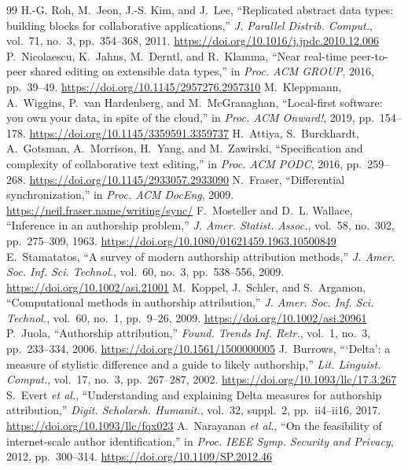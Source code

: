 \documentclass[conference]{IEEEtran}
\begin{document}
\begin{thebibliography}{99}
 H.-G. Roh, M.~Jeon, J.-S. Kim, and J.~Lee, ``Replicated abstract data types: building blocks for collaborative applications,'' \emph{J. Parallel Distrib. Comput.}, vol.~71, no.~3, pp.~354--368, 2011. \url{https://doi.org/10.1016/j.jpdc.2010.12.006}
 P.~Nicolaescu, K.~Jahns, M.~Derntl, and R.~Klamma, ``Near real-time peer-to-peer shared editing on extensible data types,'' in \emph{Proc. ACM GROUP}, 2016, pp.~39--49. \url{https://doi.org/10.1145/2957276.2957310}
 M.~Kleppmann, A.~Wiggins, P.~van Hardenberg, and M.~McGranaghan, ``Local-first software: you own your data, in spite of the cloud,'' in \emph{Proc. ACM Onward!}, 2019, pp.~154--178. \url{https://doi.org/10.1145/3359591.3359737}
 H.~Attiya, S.~Burckhardt, A.~Gotsman, A.~Morrison, H.~Yang, and M.~Zawirski, ``Specification and complexity of collaborative text editing,'' in \emph{Proc. ACM PODC}, 2016, pp.~259--268. \url{https://doi.org/10.1145/2933057.2933090}
 N.~Fraser, ``Differential synchronization,'' in \emph{Proc. ACM DocEng}, 2009. \url{https://neil.fraser.name/writing/sync/}
 F.~Mosteller and D.~L. Wallace, ``Inference in an authorship problem,'' \emph{J. Amer. Statist. Assoc.}, vol.~58, no.~302, pp.~275--309, 1963. \url{https://doi.org/10.1080/01621459.1963.10500849}
 E.~Stamatatos, ``A survey of modern authorship attribution methods,'' \emph{J. Amer. Soc. Inf. Sci. Technol.}, vol.~60, no.~3, pp.~538--556, 2009. \url{https://doi.org/10.1002/asi.21001}
 M.~Koppel, J.~Schler, and S.~Argamon, ``Computational methods in authorship attribution,'' \emph{J. Amer. Soc. Inf. Sci. Technol.}, vol.~60, no.~1, pp.~9--26, 2009. \url{https://doi.org/10.1002/asi.20961}
 P.~Juola, ``Authorship attribution,'' \emph{Found. Trends Inf. Retr.}, vol.~1, no.~3, pp.~233--334, 2006. \url{https://doi.org/10.1561/1500000005}
 J.~Burrows, ```Delta': a measure of stylistic difference and a guide to likely authorship,'' \emph{Lit. Linguist. Comput.}, vol.~17, no.~3, pp.~267--287, 2002. \url{https://doi.org/10.1093/llc/17.3.267}
 S.~Evert \emph{et al.}, ``Understanding and explaining Delta measures for authorship attribution,'' \emph{Digit. Scholarsh. Humanit.}, vol.~32, suppl.~2, pp.~ii4--ii16, 2017. \url{https://doi.org/10.1093/llc/fqx023}
 A.~Narayanan \emph{et al.}, ``On the feasibility of internet-scale author identification,'' in \emph{Proc. IEEE Symp. Security and Privacy}, 2012, pp.~300--314. \url{https://doi.org/10.1109/SP.2012.46}

\end{thebibliography}
\end{document}

